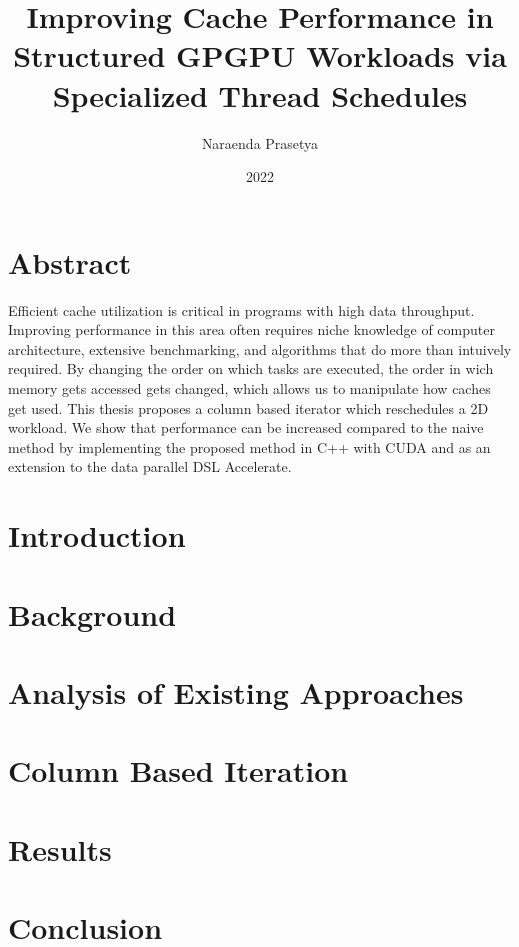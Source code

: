 \documentclass{report}
\title{Improving Cache Performance in Structured GPGPU Workloads via Specialized Thread Schedules}
\author{Naraenda Prasetya}
\date{2022}
\begin{document}
\maketitle

\chapter*{Abstract}
Efficient cache utilization is critical in programs with high data throughput.
Improving performance in this area often requires niche knowledge of computer architecture, extensive benchmarking, and algorithms that do more than intuively required.
By changing the order on which tasks are executed, the order in wich memory gets accessed gets changed, which allows us to manipulate how caches get used.
This thesis proposes a column based iterator which reschedules a 2D workload.
We show that performance can be increased compared to the naive method by implementing the proposed method in C++ with CUDA and as an extension to the data parallel DSL Accelerate.

\tableofcontents

\chapter{Introduction}
\label{chap:introduction}


\chapter{Background}
\label{chap:background}


\chapter{Analysis of Existing Approaches}
\label{chap:analysis}


\chapter{Column Based Iteration}
\label{chap:cbi}


\chapter{Results}
\label{chap:results}


\chapter{Conclusion}
\label{chap:conclusion}




\end{document}
